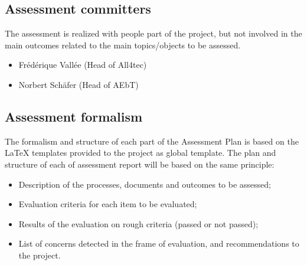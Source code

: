 \documentclass[openetcs]{template/openetcs_article}
\begin{document}
\subsection{Assessment committers}
The assessment is realized with people part of the project, but not involved in the main outcomes related to the main topics/objects to be assessed.
\begin{itemize}
\item Fr\'ed\'erique Vall\'ee (Head of All4tec)
\item Norbert Sch\"afer (Head of AEbT)
\end{itemize}

\subsection{Assessment formalism}
The formalism and structure of each part of the Assessment Plan is based on the LaTeX templates provided to the project as global template.
The plan and structure of each of assessment report will be based on the same principle:
 \begin{itemize}
\item Description of the processes, documents and outcomes to be assessed;
\item Evaluation criteria for each item to be evaluated;
\item Results of the evaluation on rough criteria (passed or not passed);
\item List of concerns detected in the frame of evaluation, and recommendations to the project.
\end{itemize}







\end{document}
